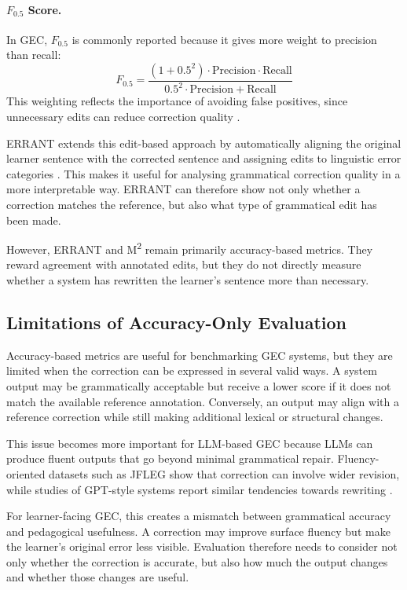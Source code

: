\paragraph{$F_{0.5}$ Score.}
In GEC, $F_{0.5}$ is commonly reported because it gives more weight to precision than recall:
\[
F_{0.5} =
\frac{(1 + 0.5^2)\cdot \text{Precision} \cdot \text{Recall}}
{0.5^2 \cdot \text{Precision} + \text{Recall}}
\]
This weighting reflects the importance of avoiding false positives, since unnecessary edits can reduce correction quality \cite{ng-etal-2014-conll}.

ERRANT extends this edit-based approach by automatically aligning the original learner sentence with the corrected sentence and assigning edits to linguistic error categories \cite{bryant-etal-2017-automatic}. This makes it useful for analysing grammatical correction quality in a more interpretable way. ERRANT can therefore show not only whether a correction matches the reference, but also what type of grammatical edit has been made.

However, ERRANT and M\textsuperscript{2} remain primarily accuracy-based metrics. They reward agreement with annotated edits, but they do not directly measure whether a system has rewritten the learner's sentence more than necessary.

\subsection{Limitations of Accuracy-Only Evaluation}

Accuracy-based metrics are useful for benchmarking GEC systems, but they are limited when the correction can be expressed in several valid ways. A system output may be grammatically acceptable but receive a lower score if it does not match the available reference annotation. Conversely, an output may align with a reference correction while still making additional lexical or structural changes.

This issue becomes more important for LLM-based GEC because LLMs can produce fluent outputs that go beyond minimal grammatical repair. Fluency-oriented datasets such as JFLEG \cite{napoles-etal-2017-jfleg} show that correction can involve wider revision, while studies of GPT-style systems report similar tendencies towards rewriting \cite{loem2023exploringeffectivenessgpt3grammatical}.

For learner-facing GEC, this creates a mismatch between grammatical accuracy and pedagogical usefulness. A correction may improve surface fluency but make the learner's original error less visible. Evaluation therefore needs to consider not only whether the correction is accurate, but also how much the output changes and whether those changes are useful.

